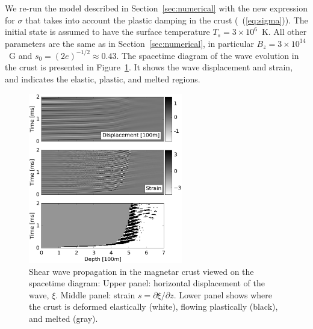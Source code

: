 We re-run the model described in Section~\ref{sec:numerical} with the new expression for $\sigma$ that takes into account the plastic damping in the crust (\Eq~(\ref{eq:sigma})).
The initial state is assumed to have the surface temperature $T_s=3\times 10^6$~K.
All other parameters are the same as in Section~\ref{sec:numerical}, in particular $B_z=3\times 10^{14}$~G and $s_0=(2e)^{-1/2}\approx 0.43$.
The spacetime diagram of the wave evolution in the crust is presented in Figure~\ref{fig5}.
It shows the wave displacement and strain, and indicates the elastic, plastic, and melted regions.
\begin{figure}[h]
\centering
\includegraphics[width=0.6\textwidth]{pics/chap3/fig5.eps} 
\caption[Shear wave propagation in the magnetar crust viewed on the spacetime 
diagram]{Shear wave propagation in the magnetar crust viewed on the spacetime diagram: Upper panel: horizontal displacement of the wave, $\xi$. 
Middle panel: strain $s=\partial\xi/\partial z$.
Lower panel shows where the crust is deformed elastically (white), flowing plastically (black), and melted (gray).}
\label{fig5}
\end{figure}

